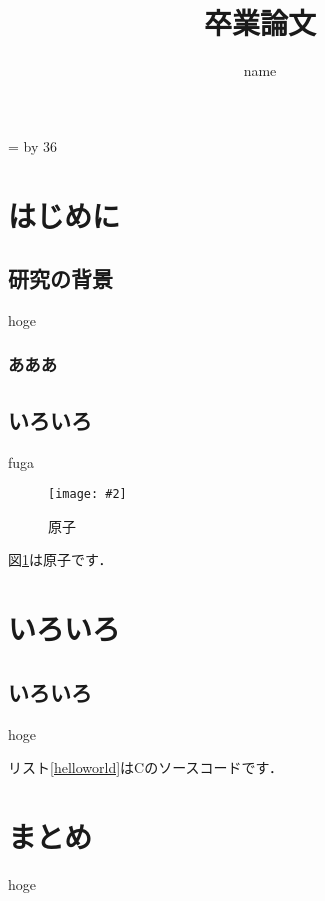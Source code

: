 \documentclass[10,5pt, a4paper, uplatex]{jsarticle}
\title{卒業論文} %
\author{name} %
\def\linesparpage#1{
    \baselineskip=\textheight
    \divide\baselineskip by #1
}
\newcommand{\figuref}[1]{図\ref{#1}}
\newcommand{\fig}[4][width=\textwidth]{
    \begin{figure}[!h]
        \begin{center}
            \texttt{[image: \#2]}
            \caption{#3}
            \label{#4}
        \end{center}
    \end{figure}
}
\newcommand{\lstref}[1]{リスト\ref{#1}}
\begin{document}
    \linesparpage{36} %

    \begin{titlepage}
        \maketitle
        \thispagestyle{empty}
    \end{titlepage}

    \setcounter{tocdepth}{3}
    \tableofcontents
    \thispagestyle{empty}
    \newpage

    \setcounter{page}{1}
    \pagestyle{plain}

    \section{はじめに}

        \subsection{研究の背景}
            hoge\cite{hoge}

            \subsubsection{あああ}

        \subsection{いろいろ}
            fuga

            \fig{image/atom.jpg}{原子}{atom}

            \figuref{atom}は原子です\cite{irasutoya}．

        \newpage

    \section{いろいろ}

        \subsection{いろいろ}
            hoge
            
            \lstref{helloworld}はCのソースコードです．

        \newpage

    \section{まとめ}
        hoge
\end{document}
